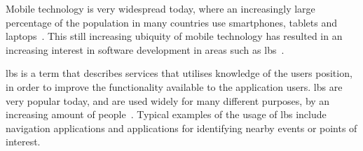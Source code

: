 Mobile technology is very widespread today, where an increasingly large percentage of the population in many countries use smartphones, tablets and laptops~\cite{techcrunch_mobile_usage}. This still increasing ubiquity of mobile technology has resulted in an increasing interest in software development in areas such as \gls{lbs}~\cite{dey2010location}. 

\gls{lbs} is a term that describes services that utilises knowledge of the users position, in order to improve the functionality available to the application users. \gls{lbs} are very popular today, and are used widely for many different purposes, by an increasing amount of people~\cite[pp. 1-2]{schiller2004location}. Typical examples of the usage of \gls{lbs} include navigation applications and applications for identifying nearby events or points of interest.


